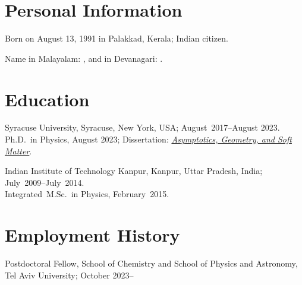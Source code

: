 \documentclass[10pt,article,oneside]{memoir}
\begin{document}
\section{Personal Information}

Born on August 13, 1991 in Palakkad, Kerala; Indian citizen.

Name in Malayalam: \hspace{-.3ex}\hspace{.1ex},
and in Devanagari: \hspace{-.4ex}\hspace{-0.15ex}.


\section{Education}

Syracuse University, Syracuse, New York, USA; August~2017--August 2023.\\
Ph.D.~in Physics, August 2023; Dissertation: \emph{\href{https://raw.githubusercontent.com/manu-mannattil/thesis/build/thesis.pdf}{Asymptotics, Geometry, and Soft Matter}}.

Indian Institute of Technology Kanpur, Kanpur, Uttar Pradesh, India; July~2009--July~2014.\\
Integrated~M.Sc.~in Physics, February~2015.




\section{Employment History}

Postdoctoral Fellow, School of Chemistry and School of Physics and Astronomy, Tel Aviv University; October 2023--
\end{document}
